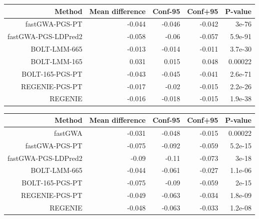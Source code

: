 \documentclass[10pt]{article}
\begin{document}
\begin{table}[!htb]
\centering
{}
\begin{tabular}{rrrrr}
  \hline
Method & Mean difference & Conf-95 & Conf+95 & P-value \\ 
  \hline
  fastGWA-PGS-PT & -0.044 & -0.046 & -0.042 & 3e-76 \\ 
  fastGWA-PGS-LDPred2 & -0.058 & -0.06 & -0.057 & 5.9e-91 \\ 
  BOLT-LMM-665 & -0.013 & -0.014 & -0.011 & 3.7e-30 \\ 
  BOLT-LMM-165 & 0.031 & 0.015 & 0.048 & 0.00022 \\ 
  BOLT-165-PGS-PT & -0.043 & -0.045 & -0.041 & 2.6e-71 \\ 
  REGENIE-PGS-PT & -0.017 & -0.02 & -0.015 & 2.2e-26 \\ 
  REGENIE & -0.016 & -0.018 & -0.015 & 1.9e-38 \\ 
   \hline
\end{tabular}
\end{table}

\begin{table}[!htb]
\centering
{}
\begin{tabular}{rrrrr}
  \hline
 Method & Mean difference & Conf-95 & Conf+95 & P-value \\ 
  \hline
fastGWA & -0.031 & -0.048 & -0.015 & 0.00022 \\ 
  fastGWA-PGS-PT & -0.075 & -0.092 & -0.059 & 5.2e-15 \\ 
  fastGWA-PGS-LDPred2 & -0.09 & -0.11 & -0.073 & 3e-18 \\ 
  BOLT-LMM-665 & -0.044 & -0.061 & -0.027 & 1.1e-06 \\ 
  BOLT-165-PGS-PT & -0.075 & -0.09 & -0.059 & 2e-15 \\ 
  REGENIE-PGS-PT & -0.049 & -0.063 & -0.034 & 1.8e-09 \\ 
  REGENIE & -0.048 & -0.063 & -0.033 & 1.2e-08 \\ 
   \hline
\end{tabular}
\end{table}
\end{document}
